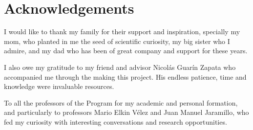 \cleardoublepage {}
{}
\chapter*{Acknowledgements}

I would like to thank my family for their support and inspiration, specially my mom, who planted in me the seed of scientific curiosity, my big sister who I admire, and my dad who has been of great company and support for these years.

I also owe my gratitude to my friend and advisor Nicol\'as Guar\'in Zapata who accompanied me through the making this project. His endless patience, time and knowledge were invaluable resources.

To all the professors of the  Program for my academic and personal formation, and particularly to professors Mario Elkin V\'elez and Juan Manuel Jaramillo, who fed my curiosity with interesting conversations and research opportunities.